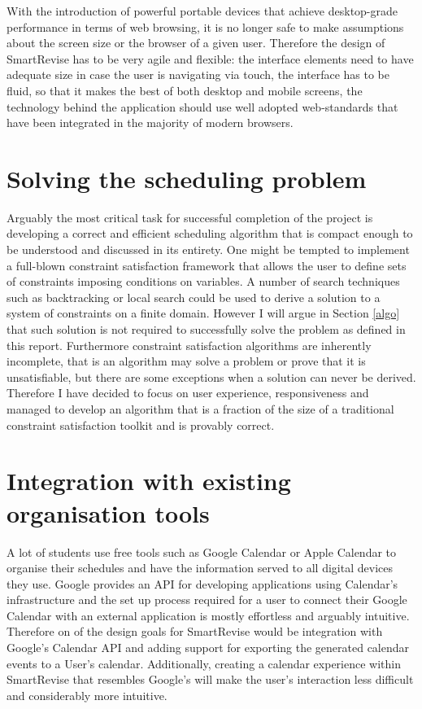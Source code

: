\documentclass[bsc,frontabs,twoside,singlespacing,parskip]{infthesis}     %
\begin{document}
		With the introduction of powerful portable devices that achieve desktop-grade performance in terms of web browsing, it is no longer safe to make assumptions about the screen size or the browser of a given user. Therefore the design of SmartRevise has to be very agile and flexible: the interface elements need to have adequate size in case the user is navigating via touch, the interface has to be fluid, so that it makes the best of both desktop and mobile screens, the technology behind the application should use well adopted web-standards that have been integrated in the majority of modern browsers.

	\section{Solving the scheduling problem}

		Arguably the most critical task for successful completion of the project is developing a correct and efficient scheduling algorithm that is compact enough to be understood and discussed in its entirety. One might be tempted to implement a full-blown constraint satisfaction framework that allows the user to define sets of constraints imposing conditions on variables. A number of search techniques such as backtracking or local search could be used to derive a solution to a system of constraints on a finite domain. However I will argue in Section \ref{algo} that such solution is not required to successfully solve the problem as defined in this report. Furthermore constraint satisfaction algorithms are inherently incomplete, that is an algorithm may solve a problem or prove that it is unsatisfiable, but there are some exceptions when a solution can never be derived. Therefore I have decided to focus on user experience, responsiveness and managed to develop an algorithm that is a fraction of the size of a traditional constraint satisfaction toolkit and is provably correct.

	\section{Integration with existing organisation tools}

		A lot of students use free tools such as Google Calendar or Apple Calendar to organise their schedules and have the information served to all digital devices they use. Google provides an API for developing applications using Calendar's infrastructure and the set up process required for a user to connect their Google Calendar with an external application is mostly effortless and arguably intuitive. Therefore on of the design goals for SmartRevise would be integration with Google's Calendar API and adding support for exporting the generated calendar events to a User's calendar. Additionally, creating a calendar experience within SmartRevise that resembles Google's will make the user's interaction less difficult and considerably more intuitive.
\end{document}
